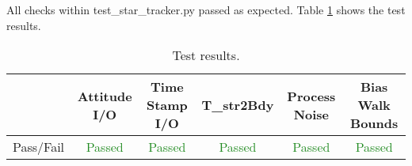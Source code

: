 \documentclass[]{BasiliskReportMemo}
\begin{document}
All checks within test\_star\_tracker.py passed as expected. Table \ref{tab:results} shows the test results.

\begin{table}[htbp]
	\caption{Test results.}
	\label{tab:results}
	\centering \fontsize{10}{10}\selectfont
	\begin{tabular}{c | c | c | c | c | c } %
		\hline
		   & Attitude I/O & Time Stamp I/O & T\_str2Bdy & Process Noise & Bias Walk Bounds \\
		\hline
		Pass/Fail & \textcolor{ForestGreen}{Passed} & \textcolor{ForestGreen}{Passed} &  \textcolor{ForestGreen}{Passed}&  \textcolor{ForestGreen}{Passed} & \textcolor{ForestGreen}{Passed}\\
		\hline
	\end{tabular}
\end{table}
\end{document}
